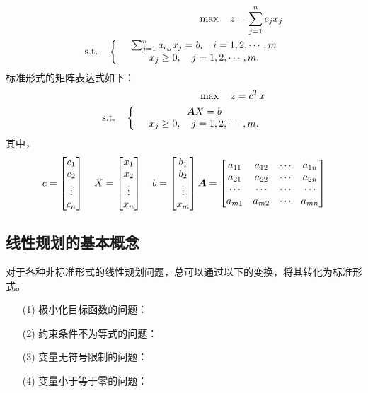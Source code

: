 \begin{frame}{\subsubsecname}
    \begin{alignat}{2}
\max \quad  z=\sum_{j=1}^n c_jx_j \nonumber\\
\mbox{s.t.}\quad
\left\{
\begin{array}{cc}\nonumber
     & \sum_{j=1}^n a_{i,j}x_j=b_i \quad i=1,2,\cdots, m\\
     & x_j \ge 0, \quad j=1,2, \cdots, m.
\end{array}
\right.
\end{alignat}
标准形式的矩阵表达式如下：
 \begin{alignat}{2}
\max \quad  z=c^Tx \nonumber\\
\mbox{s.t.}\quad
\left\{
\begin{array}{cc}\nonumber
     & {\boldsymbol{A}} X = b\\
     & x_j \ge 0, \quad j=1,2, \cdots, m.
\end{array}
\right.
\end{alignat}
其中，
$$
\begin{gathered}
   c=
    \begin{bmatrix}
    c_1 \\c_2 \\ \vdots \\c_n
    \end{bmatrix}
    \quad
  X= \begin{bmatrix}
    x_1 \\x_2 \\ \vdots \\x_n
    \end{bmatrix}
    \quad
  b= \begin{bmatrix}
    b_1 \\b_2 \\ \vdots \\x_m
    \end{bmatrix}
    {\boldsymbol{A}}=
    \begin{bmatrix}
    a_{11}&a_{12}&\cdots &a_{1n}\\
    a_{21}&a_{22}&\cdots &a_{2n}\\
    \cdots &\cdots& \cdots &\cdots\\
    a_{m1}&a_{m2}&\cdots &a_{mn}
    \end{bmatrix}
\end{gathered}
$$
\end{frame}

\subsection{线性规划的基本概念}
\begin{frame}{\subsecname}
    对于各种非标准形式的线性规划问题，总可以通过以下的变换，将其转化为标准形式。
\begin{itemize}
    \item[(1)] 极小化目标函数的问题：
\item[(2)] 约束条件不为等式的问题：
\item[(3)] 变量无符号限制的问题：
\item[(4)] 变量小于等于零的问题：
\end{itemize}
\end{frame}

